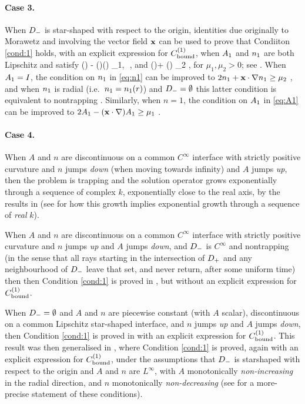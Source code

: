 \paragraph{Case 3.}
When $D_{-}$ is star-shaped with respect to the origin, identities due originally to Morawetz and involving the vector field $\mathbf{x}$ can be used to prove that Condiiton \ref{cond:1} holds, with an explicit expression for $C^{(1)}_{\rm bound}$, when $A_{1}$ and $n_{1}$ are both Lipschitz and satisfy
\beq\label{eq:A1}
\Ao(\bx) - (\bx\cdot\nabla)\Ao(\bx) \geq \mu_1,\,\, \bx\in \Dp,
\eeq
and 
\beq\label{eq:n1}
\no(\bx)+ \bx\cdot\nabla \no(\bx) \geq \mu_2 \quad{}\bx\in \Dp,
\eeq
for $\mu_1, \mu_2>0$;
see \cite[Theorem 2.5]{GrPeSp:19}. When $A_{1}= I$, the condition on $n_{1}$ in \eqref{eq:n1} can be improved to $2n_{1} + \mathbf{x} \cdot \nabla n_{1} \geq \mu_2$ \cite[Theorem 2.19(ii)]{GrPeSp:19}, and when $n_{1}$ is radial (i.e.~$n_{1}= n_{1}(r)$) and $D_{-}=\emptyset$ this latter condition is equivalent to nontrapping \cite[Theorem 7.7]{GrPeSp:19}.
Similarly, when $n= 1$, the condition on $A_{1}$ in \eqref{eq:A1} can be improved to $2A_{1} - (\mathbf{x}\cdot\nabla)A_{1} \geq \mu_1$
\cite[Theorem 2.19(i)]{GrPeSp:19}.

\paragraph{Case 4.}
When $A$ and $n$ are discontinuous on a common $C^\infty$ interface with strictly positive curvature and $n$ jumps \emph{down} (when moving towards infinity) and $A$ jumps \emph{up}, then the problem is trapping and the solution operator grows exponentially through a sequence of complex $k$, exponentially close to the real axis, by the results in \cite{PoVo:99a} (see \cite[\S6]{MoSp:19} for how this growth implies exponential growth through a sequence of \emph{real} $k$).

When $A$ and $n$ are discontinuous on a common $C^\infty$ interface with strictly positive curvature and $n$ jumps \emph{up} and $A$ jumps \emph{down}, and $D_{-}$ is 
$C^\infty$ and nontrapping (in the sense that all rays starting in the intersection of $D_{+}$ and any neighbourhood of $D_{-}$ leave that set, and never return, after some uniform time) then
then Condition \ref{cond:1} is proved in \cite{CaPoVo:99}, but without an explicit expression for $C^{(1)}_{\rm bound}$.

When $D_{-}=\emptyset$ and $A$ and $n$ are piecewise constant (with $A$ scalar), discontinuous on a common Lipschitz star-shaped interface, and $n$ jumps \emph{up} and $A$ jumps \emph{down}, then Condition \ref{cond:1} is proved in \cite{MoSp:19} with an explicit expression for $C^{(1)}_{\rm bound}$. 
This result was then generalised in \cite[Theorem 2.7]{GrPeSp:19}, where 
Condition \ref{cond:1} is proved, again with an explicit expression for $C^{(1)}_{\rm bound}$, under the assumptions that $D_{-}$ is starshaped with respect to the origin and $A$ and $n$ are $L^\infty$, with $A$ monotonically \emph{non-increasing} in the radial direction, and $n$ monotonically \emph{non-decreasing} (see \cite[Condition 2.6]{GrPeSp:19} for a more-precise statement of these conditions).


